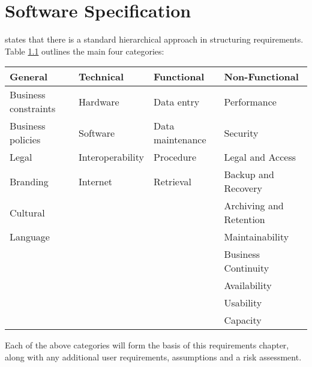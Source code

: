 \chapter{Software Specification}
\label{chap:requirements}
\citet{cadle10} states that there is a standard hierarchical approach in 
structuring requirements. Table \ref{table:requirementsCategories} outlines
the main four categories:

\begin{table}[H]
  \begin{tabular}{|l|l|l|l|}
    \hline
    {\bf General} & {\bf Technical} & {\bf Functional} & {\bf Non-Functional} \\ 
    \hline
    Business constraints & Hardware & Data entry & Performance \\ 
    Business policies & Software & Data maintenance & Security \\ 
    Legal & Interoperability & Procedure & Legal and Access \\ 
    Branding & Internet & Retrieval & Backup and Recovery \\ 
    Cultural & ~ & ~ & Archiving and Retention \\ 
    Language & ~ & ~ & Maintainability \\ 
    ~ & ~ & ~ & Business Continuity \\ 
    ~ & ~ & ~ & Availability \\ 
    ~ & ~ & ~ & Usability \\ 
    ~ & ~ & ~ & Capacity \\
    \hline
  \end{tabular}
  \label{table:requirementsCategories}
\end{table}

Each of the above categories will form the basis of this requirements chapter,
along with any additional user requirements, assumptions and a risk assessment.

\newpage


\newpage


\newpage


\newpage


\newpage


\newpage


\newpage


\newpage


\newpage

